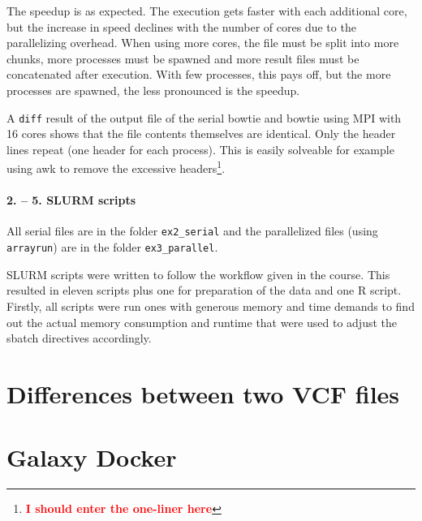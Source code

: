 \documentclass[paper=a4, 12pt]{scrartcl}
\newcommand{\xxx}[1]{\textbf{\textcolor{red}{#1}}}	%
\begin{document}
The speedup is as expected. The execution gets faster with each additional core, but the increase in speed declines with the number of cores due to the parallelizing overhead. When using more cores, the file must be split into more chunks, more processes must be spawned and more result files must be concatenated after execution. With few processes, this pays off, but the more processes are spawned, the less pronounced is the speedup.

A \texttt{diff} result of the output file of the serial bowtie and bowtie using MPI with 16 cores shows that the file contents themselves are identical. Only the header lines repeat (one header for each process). This is easily solveable for example using awk to remove the excessive headers\footnote{\xxx{I should enter the one-liner here}}.

\paragraph{2. -- 5. SLURM scripts} All serial files are in the folder \texttt{ex2\_serial} and the parallelized files (using \texttt{arrayrun}) are in the folder \texttt{ex3\_parallel}.

SLURM scripts were written to follow the workflow given in the course. This resulted in eleven scripts plus one for preparation of the data and one R script. Firstly, all scripts were run ones with generous memory and time demands to find out the actual memory consumption and runtime that were used to adjust the sbatch directives accordingly.


\section{Differences between two VCF files}



\section{Galaxy Docker}
\end{document}
